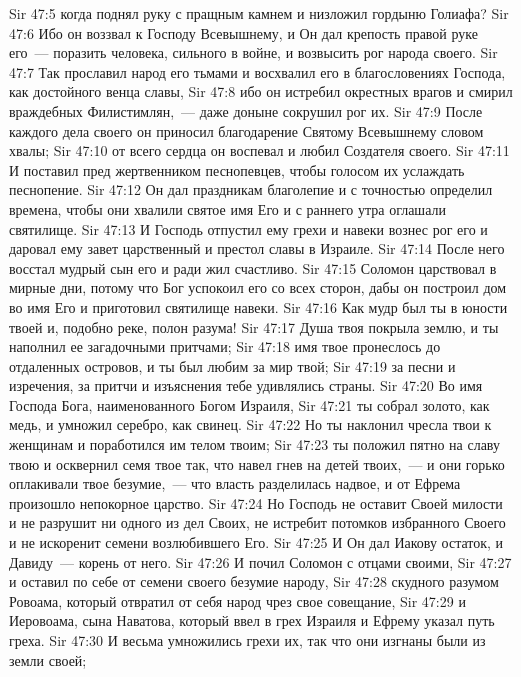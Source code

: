 \vs Sir 47:5 когда поднял руку с пращным камнем и низложил гордыню Голиафа?
\vs Sir 47:6 Ибо он воззвал к Господу Всевышнему, и Он дал крепость правой руке его~--- поразить человека, сильного в войне, и возвысить рог народа своего.
\vs Sir 47:7 Так прославил народ его тьмами и восхвалил его в благословениях Господа, как достойного венца славы,
\vs Sir 47:8 ибо он истребил окрестных врагов и смирил враждебных Филистимлян,~--- даже доныне сокрушил рог их.
\vs Sir 47:9 После каждого дела своего он приносил благодарение Святому Всевышнему словом хвалы;
\vs Sir 47:10 от всего сердца он воспевал и любил Создателя своего.
\vs Sir 47:11 И поставил пред жертвенником песнопевцев, чтобы голосом их услаждать песнопение.
\vs Sir 47:12 Он дал праздникам благолепие и с точностью определил времена, чтобы они хвалили святое имя Его и с раннего утра оглашали святилище.
\vs Sir 47:13 И Господь отпустил ему грехи и навеки вознес рог его и даровал ему завет царственный и престол славы в Израиле.
\vs Sir 47:14 После него восстал мудрый сын его и ради  жил счастливо.
\vs Sir 47:15 Соломон царствовал в мирные дни, потому что Бог успокоил его со всех сторон, дабы он построил дом во имя Его и приготовил святилище навеки.
\vs Sir 47:16 Как мудр был ты в юности твоей и, подобно реке, полон разума!
\vs Sir 47:17 Душа твоя покрыла землю, и ты наполнил ее загадочными притчами;
\vs Sir 47:18 имя твое пронеслось до отдаленных островов, и ты был любим за мир твой;
\vs Sir 47:19 за песни и изречения, за притчи и изъяснения тебе удивлялись страны.
\vs Sir 47:20 Во имя Господа Бога, наименованного Богом Израиля,
\vs Sir 47:21 ты собрал золото, как медь, и умножил серебро, как свинец.
\vs Sir 47:22 Но ты наклонил чресла твои к женщинам и поработился им телом твоим;
\vs Sir 47:23 ты положил пятно на славу твою и осквернил семя твое так, что навел гнев на детей твоих,~--- и они горько оплакивали твое безумие,~--- что власть разделилась надвое, и от Ефрема произошло непокорное царство.
\vs Sir 47:24 Но Господь не оставит Своей милости и не разрушит ни одного из дел Своих, не истребит потомков избранного Своего и не искоренит семени возлюбившего Его.
\vs Sir 47:25 И Он дал Иакову остаток, и Давиду~--- корень от него.
\rsbpar\vs Sir 47:26 И почил Соломон с отцами своими,
\vs Sir 47:27 и оставил по себе от семени своего безумие народу,
\vs Sir 47:28 скудного разумом Ровоама, который отвратил от себя народ чрез свое совещание,
\vs Sir 47:29 и Иеровоама, сына Наватова, который ввел в грех Израиля и Ефрему указал путь греха.
\vs Sir 47:30 И весьма умножились грехи их, так что они изгнаны были из земли своей;
